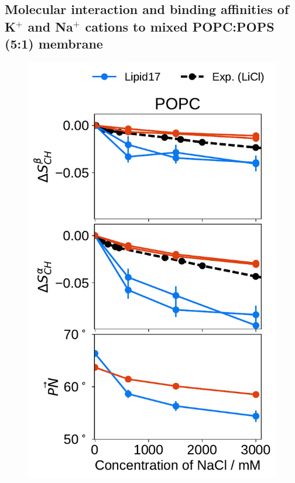 \documentclass[journal=jpcbfk,manuscript=article]{achemso}
\newlength{\figheight}
\begin{document}
 
 
 


\subsection{Molecular interaction and binding affinities of K$^+$ and Na$^+$ cations to mixed POPC:POPS (5:1) membrane} 
\label{sec:affinity} 

 
 
\begin{figure}[tbp!] 
  \centering 
  \includegraphics[height=\figheight]{../img/ecc_pops/order_parameters_changes_ecc-lip_L14_A-B-PN-COO_POPC_nacl.pdf} 

\end{figure}
\end{document}
